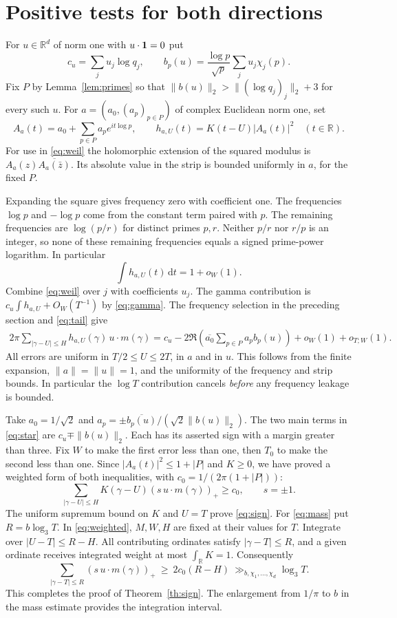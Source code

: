 \documentclass[11pt]{article}
\newcommand{\R}{\mathbb R}\newcommand{\C}{\mathbb C}\newcommand{\Z}{\mathbb Z}
\newcommand{\dd}{\,\mathrm d}
\newcommand{\lthree}{\log_3 T}
\begin{document}
\section{Positive tests for both directions}

For $u\in\R^d$ of norm one with $u\cdot\mathbf 1=0$ put
\[
 c_u=\sum_j u_j\log q_j,\qquad
 b_p(u)=\frac{\log p}{\sqrt p}\sum_j u_j\chi_j(p).
\]
Fix $P$ by Lemma~\ref{lem:primes} so that
$\|b(u)\|_2>\| (\log q_j)_j\|_2+3$ for every such $u$.
For $a=(a_0,(a_p)_{p\in P})$ of complex Euclidean norm one, set
\[
 A_a(t)=a_0+\sum_{p\in P}a_p e^{it\log p},\qquad
 h_{a,U}(t)=K(t-U)|A_a(t)|^2 \quad(t\in\R).
\]
For use in \eqref{eq:weil} the holomorphic extension of the squared modulus
is $A_a(z)\overline{A_a(\bar z)}$. Its absolute value in the strip is
bounded uniformly in $a$, for the fixed $P$.

Expanding the square gives frequency zero with coefficient one. The
frequencies $\log p$ and $-\log p$ come from the constant term paired
with $p$. The remaining frequencies are $\log(p/r)$ for distinct primes
$p,r$. Neither $p/r$ nor $r/p$ is an integer, so none of these remaining
frequencies equals a signed prime-power logarithm. In particular
\[
 \int h_{a,U}(t)\dd t=1+o_W(1).
\]
Combine \eqref{eq:weil} over $j$ with coefficients $u_j$. The gamma
contribution is $c_u\int h_{a,U}+O_W(T^{-1})$ by \eqref{eq:gamma}.
The frequency selection in the preceding section and \eqref{eq:tail} give
\begin{align}
 2\pi\sum_{|\gamma-U|\le H} h_{a,U}(\gamma)\, u\cdot m(\gamma)
 = c_u-2\Re\!\left(\overline{a_0}\sum_{p\in P}a_p b_p(u)\right)
       +o_W(1)+o_{T;W}(1).\label{eq:star}
\end{align}
All errors are uniform in $T/2\le U\le 2T$, in $a$ and in $u$.
This follows from the finite expansion, $\|a\|=\|u\|=1$, and the
uniformity of the frequency and strip bounds. In particular the
$\log T$ contribution cancels \emph{before} any frequency leakage is bounded.

Take $a_0=1/\sqrt2$ and $a_p=\pm\overline{b_p(u)}/(\sqrt2\|b(u)\|_2)$.
The two main terms in \eqref{eq:star} are $c_u\mp\|b(u)\|_2$.
Each has its asserted sign with a margin greater than three. Fix $W$ to
make the first error less than one, then $T_0$ to make the second less than
one. Since $|A_a(t)|^2\le 1+|P|$ and $K\ge0$, we have proved a weighted
form of both inequalities, with $c_0=1/(2\pi(1+|P|))$:
\begin{equation}
 \sum_{|\gamma-U|\le H}K(\gamma-U)
       (s\,u\cdot m(\gamma))_+\ge c_0,\qquad s=\pm1 .
 \label{eq:weighted}
\end{equation}
The uniform supremum bound on $K$ and $U=T$ prove \eqref{eq:sign}.
For \eqref{eq:mass} put $R=b\lthree$. In \eqref{eq:weighted}, $M,W,H$
are fixed at their values for $T$. Integrate over $|U-T|\le R-H$.
All contributing ordinates satisfy $|\gamma-T|\le R$, and a given
ordinate receives integrated weight at most $\int_\R K=1$. Consequently
\[
 \sum_{|\gamma-T|\le R}(s\,u\cdot m(\gamma))_+
 \ \ge\ 2c_0(R-H) \ \gg_{b,\chi_1,\ldots,\chi_d}\lthree .
\]
This completes the proof of Theorem~\ref{th:sign}. The enlargement from
$1/\pi$ to $b$ in the mass estimate provides the integration interval.
\end{document}
